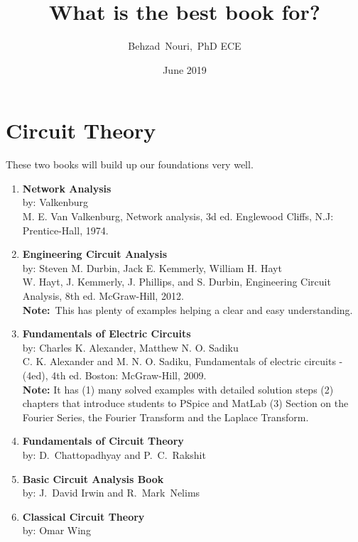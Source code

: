 \documentclass{article}
\title{What is the best book for?}
\author{Behzad~Nouri,~{\small PhD ECE}}
\date{June 2019}
\begin{document}
\maketitle
\tableofcontents
\newpage
\section{Circuit Theory}
These two books will build up our foundations very well.
\begin{enumerate}
\item \textbf{Network Analysis}
    \\by: Valkenburg
    \\[6pt]M. E. Van Valkenburg, Network analysis, 3d ed. Englewood Cliffs, N.J: Prentice-Hall, 1974.
    \item \textbf{Engineering Circuit Analysis}
    \\by: Steven M. Durbin, Jack E. Kemmerly, William H. Hayt
    \\[6pt]W. Hayt, J. Kemmerly, J. Phillips, and S. Durbin, Engineering Circuit Analysis, 8th ed. McGraw-Hill, 2012.
    \\[6pt]\textbf{Note:}~This has plenty of examples helping a clear and easy understanding.
    \item \textbf{Fundamentals of Electric Circuits}
    \\by: Charles K. Alexander, Matthew N. O. Sadiku
    \\[6pt]C. K. Alexander and M. N. O. Sadiku, Fundamentals of electric circuits - (4ed), 4th ed. Boston: McGraw-Hill, 2009.
    \\[6pt]\textbf{Note:} It has (1) many solved examples with detailed solution steps (2) chapters that introduce students to PSpice and MatLab (3) Section on the Fourier Series, the Fourier Transform and the Laplace Transform.

    \item \textbf{Fundamentals of Circuit Theory}\\
    by: D.~Chattopadhyay and P.~C.~Rakshit
    \item \textbf{Basic Circuit Analysis Book}\\
    by: J.~David Irwin and R.~Mark~Nelims
    \item\textbf{Classical Circuit Theory}\\
    by: Omar Wing
\end{enumerate}
\end{document}
